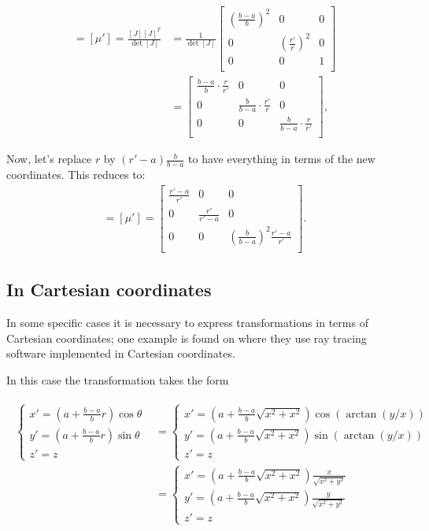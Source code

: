 \documentclass{amsart}
\begin{document}
\begin{align*}
  [\varepsilon'] =[\mu']= \frac{[J][J]^T}{\det[J]}&=\frac{1}{\det[J]}
  \begin{bmatrix}
    \left(\frac{b-a}{b}\right)^2  & 0 & 0\\
    0 & \left(\frac{r'}{r}\right)^2 & 0\\
    0 & 0 & 1\\
  \end{bmatrix}\\
  &=
  \begin{bmatrix}
    \frac{b-a}{b}\cdot\frac{r}{r'}  & 0 & 0\\
    0 & \frac{b}{b-a}\cdot\frac{r'}{r} & 0\\
    0 & 0 & \frac{b}{b-a}\cdot\frac{r}{r'}\\
  \end{bmatrix},
\end{align*}

Now, let's replace \(r\) by \((r'-a)\frac{b}{b-a}\) to have everything
in terms of the new coordinates. This reduces to:
\begin{align}
  [\varepsilon'] =[\mu']=\begin{bmatrix}
    \frac{r'-a}{r'} & 0 & 0\\
    0 & \frac{r'}{r'-a} & 0\\
    0 & 0 & \left(\frac{b}{b-a}\right)^2\frac{r'-a}{r'}\\
  \end{bmatrix}.
\end{align}

\subsection{In Cartesian coordinates}
In some specific cases it is necessary to express transformations in terms of Cartesian coordinates;
one example is found on \cite{Schurig06_ray} where they use ray tracing software implemented in Cartesian coordinates.

In this case the transformation takes the form

\begin{align}\label{transformationCartesian}
\begin{split}
\begin{cases}
x'=(a+\frac{b-a}{b}r)\cos\theta\\
y'=(a+\frac{b-a}{b}r)\sin\theta\\
z'=z
\end{cases}
&=
\begin{cases}
x'=(a+\frac{b-a}{b}\sqrt{x^2+x^2})\cos(\arctan(y/x))\\
y'=(a+\frac{b-a}{b}\sqrt{x^2+x^2})\sin(\arctan(y/x))\\
z'=z
\end{cases}\\
&=
\begin{cases}
  x'=\left(a+\frac{b-a}{b}\sqrt{x^2+x^2}\right)\frac{x}{\sqrt{x^2+y^2}}\\
y'=\left(a+\frac{b-a}{b}\sqrt{x^2+x^2}\right)\frac{y}{\sqrt{x^2+y^2}}\\
z'=z
\end{cases}
\end{split}
\end{align}
\end{document}
